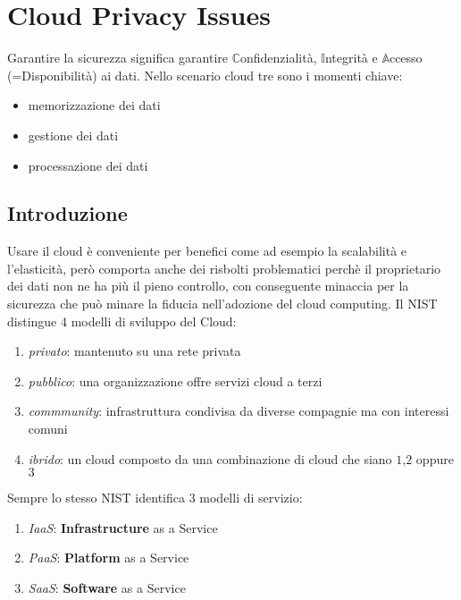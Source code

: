 \chapter{Cloud Privacy Issues}
Garantire la sicurezza significa garantire $\mathbb{C}$onfidenzialità, $\mathbb{I}$ntegrità e $\mathbb{A}$ccesso (=Disponibilità) ai dati. Nello scenario cloud tre sono i momenti chiave:
\begin{itemize}
    \item memorizzazione dei dati
    \item gestione dei dati
    \item processazione dei dati
\end{itemize}
\section{Introduzione}
Usare il cloud è conveniente per benefici come ad esempio la scalabilità e l'elasticità, però comporta anche dei risbolti problematici perchè il proprietario dei dati non ne ha più il pieno controllo, con conseguente minaccia per la sicurezza che può minare la fiducia nell'adozione del cloud computing. Il NIST distingue 4 modelli di sviluppo del Cloud:
\begin{enumerate}
    \item \textit{privato}: mantenuto su una rete privata
    \item \textit{pubblico}: una organizzazione offre servizi cloud a terzi
    \item \textit{commmunity}: infrastruttura condivisa da diverse compagnie ma con interessi comuni
    \item \textit{ibrido}: un cloud composto da una combinazione di cloud che siano $1$,$2$ oppure $3$
\end{enumerate}
Sempre lo stesso NIST identifica 3 modelli di servizio:
\begin{enumerate}
    \item \textit{IaaS}: \textbf{Infrastructure} as a Service
    \item \textit{PaaS}: \textbf{Platform} as a Service
    \item \textit{SaaS}: \textbf{Software} as a Service
\end{enumerate}
